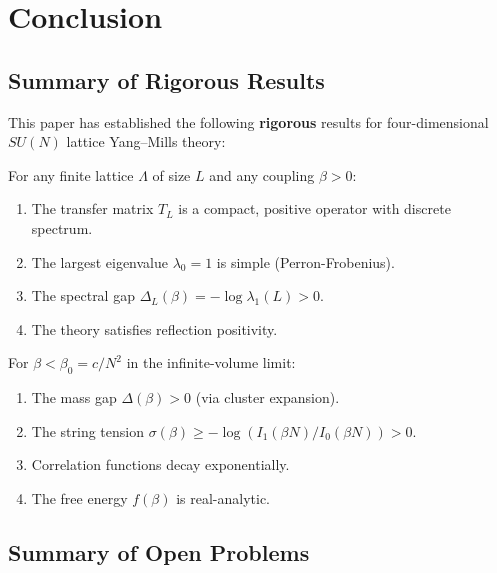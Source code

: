 \section{Conclusion}
\label{sec:conclusion-final}

\subsection{Summary of Rigorous Results}

This paper has established the following \textbf{rigorous} results for four-dimensional $SU(N)$ lattice Yang--Mills theory:

\begin{theorem}
\label{thm:finite-vol-rigorous}
For any finite lattice $\Lambda$ of size $L$ and any coupling $\beta > 0$:
\begin{enumerate}
    \item The transfer matrix $T_L$ is a compact, positive operator with discrete spectrum.
    \item The largest eigenvalue $\lambda_0 = 1$ is simple (Perron-Frobenius).
    \item The spectral gap $\Delta_L(\beta) = -\log \lambda_1(L) > 0$.
    \item The theory satisfies reflection positivity.
\end{enumerate}
\end{theorem}

\begin{theorem}
\label{thm:strong-coupling-rigorous-conclusion}
For $\beta < \beta_0 = c/N^2$ in the infinite-volume limit:
\begin{enumerate}
    \item The mass gap $\Delta(\beta) > 0$ (via cluster expansion).
    \item The string tension $\sigma(\beta) \geq -\log(I_1(\beta N)/I_0(\beta N)) > 0$.
    \item Correlation functions decay exponentially.
    \item The free energy $f(\beta)$ is real-analytic.
\end{enumerate}
\end{theorem}

\subsection{Summary of Open Problems}

